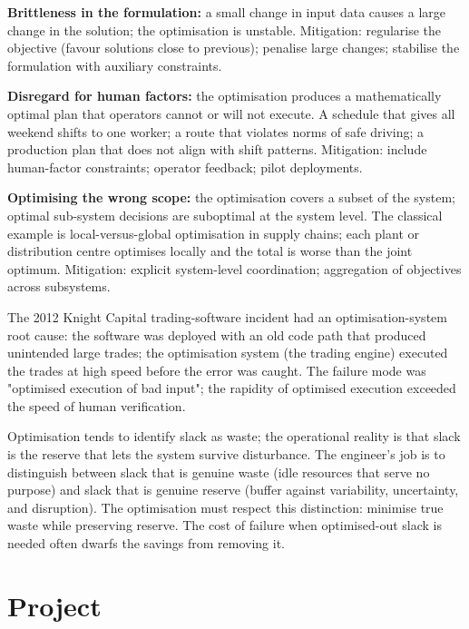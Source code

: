 \textbf{Brittleness in the formulation:} a small change in input data causes a large change in the solution; the optimisation is unstable. Mitigation: regularise the objective (favour solutions close to previous); penalise large changes; stabilise the formulation with auxiliary constraints.

\textbf{Disregard for human factors:} the optimisation produces a mathematically optimal plan that operators cannot or will not execute. A schedule that gives all weekend shifts to one worker; a route that violates norms of safe driving; a production plan that does not align with shift patterns. Mitigation: include human-factor constraints; operator feedback; pilot deployments.

\textbf{Optimising the wrong scope:} the optimisation covers a subset of the system; optimal sub-system decisions are suboptimal at the system level. The classical example is local-versus-global optimisation in supply chains; each plant or distribution centre optimises locally and the total is worse than the joint optimum. Mitigation: explicit system-level coordination; aggregation of objectives across subsystems.

The 2012 Knight Capital trading-software incident had an optimisation-system root cause: the software was deployed with an old code path that produced unintended large trades; the optimisation system (the trading engine) executed the trades at high speed before the error was caught. The failure mode was "optimised execution of bad input"; the rapidity of optimised execution exceeded the speed of human verification.

\begin{principle}
Optimisation tends to identify slack as waste; the operational reality is that slack is the reserve that lets the system survive disturbance. The engineer's job is to distinguish between slack that is genuine waste (idle resources that serve no purpose) and slack that is genuine reserve (buffer against variability, uncertainty, and disruption). The optimisation must respect this distinction: minimise true waste while preserving reserve. The cost of failure when optimised-out slack is needed often dwarfs the savings from removing it.
\end{principle}

\section{Project}


